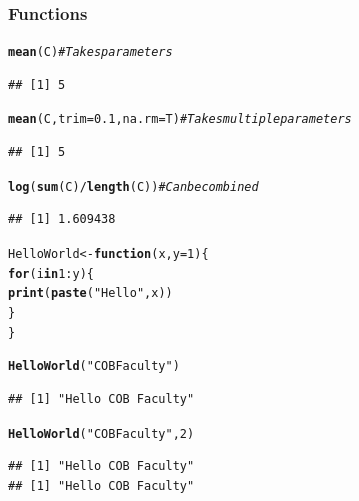 \documentclass{beamer}\usepackage[]{graphicx}\usepackage[]{color}
\makeatletter
\newcommand{\hlnum}[1]{\textcolor[rgb]{0.686,0.059,0.569}{#1}}%
\newcommand{\hlstr}[1]{\textcolor[rgb]{0.192,0.494,0.8}{#1}}%
\newcommand{\hlcom}[1]{\textcolor[rgb]{0.678,0.584,0.686}{\textit{#1}}}%
\newcommand{\hlopt}[1]{\textcolor[rgb]{0,0,0}{#1}}%
\newcommand{\hlstd}[1]{\textcolor[rgb]{0.345,0.345,0.345}{#1}}%
\newcommand{\hlkwa}[1]{\textcolor[rgb]{0.161,0.373,0.58}{\textbf{#1}}}%
\newcommand{\hlkwb}[1]{\textcolor[rgb]{0.69,0.353,0.396}{#1}}%
\newcommand{\hlkwc}[1]{\textcolor[rgb]{0.333,0.667,0.333}{#1}}%
\newcommand{\hlkwd}[1]{\textcolor[rgb]{0.737,0.353,0.396}{\textbf{#1}}}%
\newenvironment{kframe}{%
 \def\at@end@of@kframe{}%
 \ifinner\ifhmode%
  \def\at@end@of@kframe{\end{minipage}}%
  \begin{minipage}{\columnwidth}%
 \fi\fi%
 \def\FrameCommand##1{\hskip\@totalleftmargin \hskip-\fboxsep
 \colorbox{shadecolor}{##1}\hskip-\fboxsep
     \hskip-\linewidth \hskip-\@totalleftmargin \hskip\columnwidth}%
 \MakeFramed {\advance\hsize-\width
   \@totalleftmargin\z@ \linewidth\hsize
   \@setminipage}}%
 {\par\unskip\endMakeFramed%
 \at@end@of@kframe}
\newenvironment{knitrout}{}{} %
\makeatother
\begin{document}
\begin{frame}
\frametitle{Functions}



\begin{knitrout}\scriptsize
{}\color{fgcolor}\begin{kframe}
\begin{alltt}
\hlkwd{mean}\hlstd{(C)}  \hlcom{# Takes parameters}
\end{alltt}
\begin{verbatim}
## [1] 5
\end{verbatim}
\begin{alltt}
\hlkwd{mean}\hlstd{(C,} \hlkwc{trim} \hlstd{=} \hlnum{0.1}\hlstd{,} \hlkwc{na.rm} \hlstd{= T)}  \hlcom{# Takes multiple parameters}
\end{alltt}
\begin{verbatim}
## [1] 5
\end{verbatim}
\begin{alltt}
\hlkwd{log}\hlstd{(}\hlkwd{sum}\hlstd{(C)}\hlopt{/}\hlkwd{length}\hlstd{(C))}  \hlcom{# Can be combined}
\end{alltt}
\begin{verbatim}
## [1] 1.609438
\end{verbatim}
\end{kframe}
\end{knitrout}

\begin{knitrout}\scriptsize
{}\color{fgcolor}\begin{kframe}
\begin{alltt}
\hlstd{HelloWorld} \hlkwb{<-} \hlkwa{function}\hlstd{(}\hlkwc{x}\hlstd{,} \hlkwc{y} \hlstd{=} \hlnum{1}\hlstd{) \{}
    \hlkwa{for} \hlstd{(i} \hlkwa{in} \hlnum{1}\hlopt{:}\hlstd{y) \{}
        \hlkwd{print}\hlstd{(}\hlkwd{paste}\hlstd{(}\hlstr{"Hello"}\hlstd{, x))}
    \hlstd{\}}
\hlstd{\}}

\hlkwd{HelloWorld}\hlstd{(}\hlstr{"COB Faculty"}\hlstd{)}
\end{alltt}
\begin{verbatim}
## [1] "Hello COB Faculty"
\end{verbatim}
\begin{alltt}
\hlkwd{HelloWorld}\hlstd{(}\hlstr{"COB Faculty"}\hlstd{,} \hlnum{2}\hlstd{)}
\end{alltt}
\begin{verbatim}
## [1] "Hello COB Faculty"
## [1] "Hello COB Faculty"
\end{verbatim}
\end{kframe}
\end{knitrout}


\end{frame}
\end{document}

